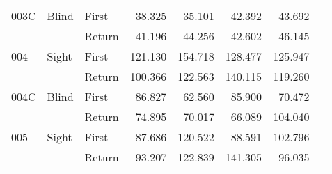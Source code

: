\begin{table}[!htb]
\begin{tabular}{lllrrrrr}
003C & Blind & First &  38.325 &                                                 35.101 &                                                  42.392 &   43.692 \\
    &       & Return &  41.196 &                                                 44.256 &                                                  42.602 &   46.145 \\
004 & Sight & First & 121.130 &                                                154.718 &                                                 128.477 &  125.947 \\
    &       & Return & 100.366 &                                                122.563 &                                                 140.115 &  119.260 \\
004C & Blind & First &  86.827 &                                                 62.560 &                                                  85.900 &   70.472 \\
    &       & Return &  74.895 &                                                 70.017 &                                                  66.089 &  104.040 \\
005 & Sight & First &  87.686 &                                                120.522 &                                                  88.591 &  102.796 \\
    &       & Return &  93.207 &                                                122.839 &                                                 141.305 &   96.035 \\
\bottomrule
\end{tabular}
\end{table}

